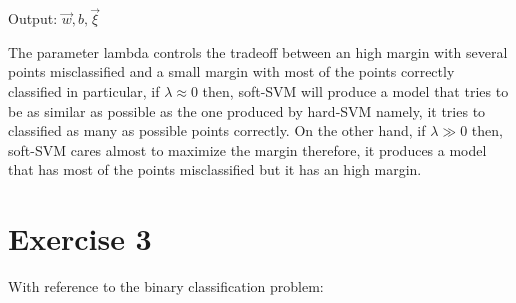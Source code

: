 \documentclass[a4paper,11pt,oneside]{book}
\begin{document}
\begin{enumerate}
\begin{solution}
        Output: $\vec{w}, b, \vec{\xi}$
        
        The parameter lambda controls the tradeoff between an high margin with several points misclassified and a small margin with most of the points correctly classified in particular, if $\lambda \approx 0$ then, soft-SVM will produce a model that tries to be as similar as possible as the one produced by hard-SVM namely, it tries to classified as many as possible points correctly. On the other hand, if $\lambda \gg 0$ then, soft-SVM cares almost to maximize the margin therefore, it produces a model that has most of the points misclassified but it has an high margin.
    \end{solution}
\end{enumerate}

\section{Exercise 3}
With reference to the binary classification problem:
\end{document}
